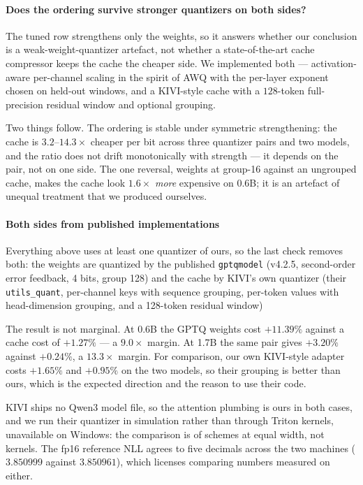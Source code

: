 \documentclass[10pt,journal]{IEEEtran}
\begin{document}
\paragraph*{Does the ordering survive stronger quantizers on both sides?}
The tuned row strengthens only the weights, so it answers whether our conclusion
is a weak-weight-quantizer artefact, not whether a state-of-the-art cache
compressor keeps the cache the cheaper side. We implemented both ---
activation-aware per-channel scaling in the spirit of AWQ with the per-layer
exponent chosen on held-out windows, and a KIVI-style cache with a $128$-token
full-precision residual window and optional grouping.

Two things follow. The ordering is stable under symmetric strengthening: the
cache is $3.2$--$14.3\times$ cheaper per bit across three quantizer pairs and
two models, and the ratio does not drift monotonically with strength --- it
depends on the pair, not on one side. The one reversal, weights at group-16 against an ungrouped cache, makes the
cache look $1.6\times$ \emph{more} expensive on 0.6B; it is an artefact of
unequal treatment that we produced ourselves.

\paragraph*{Both sides from published implementations}
Everything above uses at least one quantizer of ours, so the last check removes
both: the weights are quantized by the published \texttt{gptqmodel} (v4.2.5,
second-order error feedback, 4 bits, group 128) and the cache by KIVI's own
quantizer (their \texttt{utils\_quant}, per-channel keys with sequence grouping,
per-token values with head-dimension grouping, and a 128-token residual window)

The result is not marginal. At 0.6B the GPTQ weights cost $+11.39\%$ against a
cache cost of $+1.27\%$ --- a $9.0\times$ margin. At 1.7B the same pair gives
$+3.20\%$ against $+0.24\%$, a $13.3\times$ margin. For comparison, our own
KIVI-style adapter costs $+1.65\%$ and $+0.95\%$ on the two models, so their
grouping is better than ours, which is the expected direction and the reason to
use their code.

KIVI ships no Qwen3 model file, so the attention plumbing is ours in both cases,
and we run their quantizer in simulation rather than through Triton kernels,
unavailable on Windows: the comparison is of schemes at equal width, not kernels.
The fp16 reference NLL agrees to five decimals across the two machines
($3.850999$ against $3.850961$), which licenses comparing numbers measured on
either.
\end{document}
